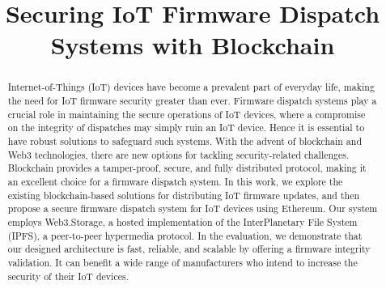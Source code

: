 \documentclass[conference]{IEEEtran}
\begin{document}
\title{Securing IoT Firmware Dispatch Systems with Blockchain
}

\author{
}

\maketitle

\begin{abstract}
Internet-of-Things (IoT) devices have become a prevalent part of everyday life, making the need for IoT firmware security greater than ever. Firmware dispatch systems play a crucial role in maintaining the secure operations of IoT devices, where a compromise on the integrity of dispatches may simply ruin an IoT device. Hence it is essential to have robust solutions to safeguard such systems. With the advent of blockchain and Web3 technologies, there are new options for tackling security-related challenges. Blockchain provides a tamper-proof, secure, and fully distributed protocol, making it an excellent choice for a firmware dispatch system. In this work, we explore the existing blockchain-based solutions for distributing IoT firmware updates, and then propose a secure firmware dispatch system for IoT devices using Ethereum. Our system employs Web3.Storage, a hosted implementation of the InterPlanetary File System (IPFS), a peer-to-peer hypermedia protocol. In the evaluation, we demonstrate that our designed architecture is fast, reliable, and scalable by offering a firmware integrity validation. It can benefit a wide range of manufacturers who intend to increase the security of their IoT devices.

\end{abstract}
\end{document}
